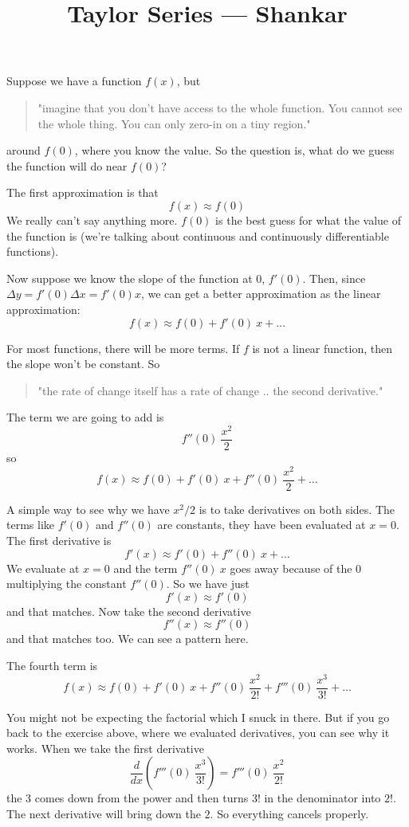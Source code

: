 \documentclass[11pt, oneside]{article}
\title{Taylor Series --- Shankar}
\date{}
\begin{document}
\maketitle
\Large

Suppose we have a function $f(x)$, but 
\begin{quote}"imagine that you don't have access to the whole function.  You cannot see the whole thing.  You can only zero-in on a tiny region."\end{quote}

around $f(0)$, where you know the value.  So the question is, what do we guess the function will do near $f(0)$?  
 
The first approximation is that
\[ f(x) \approx f(0) \]
We really can't say anything more.  $f(0)$ is the best guess for what the value of the function is (we're talking about continuous and continuously differentiable functions).

Now suppose we know the slope of the function at $0$, $f'(0)$.  Then, since $\Delta y = f'(0) \Delta x = f'(0) x$, we can get a better approximation as the linear approximation:
\[ f(x) \approx f(0) + f'(0)\ x + \dots \]

For most functions, there will be more terms.  If $f$ is not a linear function, then the slope won't be constant.  So 

\begin{quote}"the rate of change itself has a rate of change .. the second derivative."\end{quote}  

The term we are going to add is
\[ f''(0)\ \frac{x^2}{2} \]
so
\[ f(x) \approx f(0) + f'(0)\ x + f''(0)\ \frac{x^2}{2}  + \dots \]

A simple way to see why we have $x^2/2$ is to take derivatives on both sides.  The terms like $f'(0)$ and $f''(0)$ are constants, they have been evaluated at $x=0$. The first derivative is
\[ f'(x) \approx  f'(0) + f''(0)\ x  + \dots \]
We evaluate at $x=0$ and the term $f''(0)\ x$ goes away because of the $0$ multiplying the constant $f''(0)$.  So we have just
\[ f'(x) \approx  f'(0)  \]
and that matches. Now take the second derivative
\[ f''(x) \approx  f''(0) \]
and that matches too.  We can see a pattern here.  

The fourth term is
\[ f(x) \approx f(0) + f'(0)\ x + f''(0)\ \frac{x^2}{2!}  + f'''(0)\ \frac{x^3}{3!} + \dots \]

You might not be expecting the factorial which I snuck in there.  But if you go back to the exercise above, where we evaluated derivatives, you can see why it works.  When we take the first derivative 
\[ \frac{d}{dx} (f'''(0)\ \frac{x^3}{3!}) =  f'''(0)\ \frac{x^2}{2!}\]
the $3$ comes down from the power and then turns $3!$ in the denominator into $2!$.  The next derivative will bring down the $2$.  So everything cancels properly.  
\end{document}
